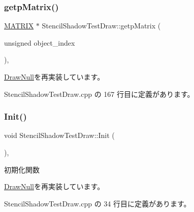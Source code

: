 \subsubsection{\texorpdfstring{getp\+Matrix()}{getpMatrix()}}
{\footnotesize\ttfamily \mbox{\hyperlink{_vector3_d_8h_a032295cd9fb1b711757c90667278e744}{M\+A\+T\+R\+IX}} $\ast$ Stencil\+Shadow\+Test\+Draw\+::getp\+Matrix (\begin{DoxyParamCaption}\item[{unsigned}]{object\+\_\+index }\end{DoxyParamCaption})\hspace{0.3cm}{\ttfamily [override]}, {\ttfamily [virtual]}}



\mbox{\hyperlink{class_draw_null_a001901c340671106a33d44b9d4aef4c4}{Draw\+Null}}を再実装しています。



 Stencil\+Shadow\+Test\+Draw.\+cpp の 167 行目に定義があります。

\mbox{\label{class_stencil_shadow_test_draw_a65be72e71cd12cacf315b0364c12c3e3}} 
\subsubsection{\texorpdfstring{Init()}{Init()}}
{\footnotesize\ttfamily void Stencil\+Shadow\+Test\+Draw\+::\+Init (\begin{DoxyParamCaption}{ }\end{DoxyParamCaption})\hspace{0.3cm}{\ttfamily [override]}, {\ttfamily [virtual]}}



初期化関数 



\mbox{\hyperlink{class_draw_null_acd7fef3ccea1da537ac9507ffbb6dd2e}{Draw\+Null}}を再実装しています。



 Stencil\+Shadow\+Test\+Draw.\+cpp の 34 行目に定義があります。

\mbox{\label{class_stencil_shadow_test_draw_a68917115d3f151ed91ce297924ee5bbb}} 
